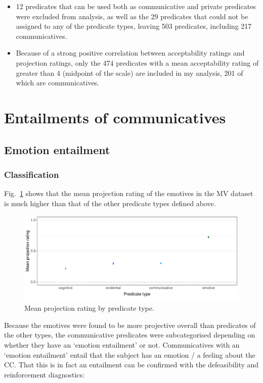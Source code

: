 \documentclass[11pt,fleqn]{article}
\newcommand{\figref}[1]{Fig.~\ref{#1}}
\newcommand{\6}{\mbox{$[\hspace*{-.6mm}[$}}
\newcommand{\9}{\mbox{$]\hspace*{-.6mm}]$}}
\begin{document}
\begin{itemize}
\begin{itemize}
	\end{itemize}
	\item 12 predicates that can be used both as communicative and private predicates were excluded from analysis, as well as the 29 predicates that could not be assigned to any of the predicate types, leaving 503 predicates, including 217 communicatives.
	\item Because of a strong positive correlation between acceptability ratings and projection ratings, only the 474 predicates with a mean acceptability rating of greater than 4 (midpoint of the scale) are included in my analysis, 201 of which are communicatives.
\end{itemize}

\section{Entailments of communicatives}
\subsection{Emotion entailment}
\subsubsection{Classification}
\figref{projpredtype} shows that the mean projection rating of the emotives in the MV dataset is much higher than that of the other predicate types defined above.

\begin{figure}[H]
	\centering
	\includegraphics[width=1\textwidth]{projection-by-predicateType}
	\caption{Mean projection rating by predicate type.}
	\label{projpredtype}
\end{figure}

Because the emotives were found to be more projective overall than predicates of the other types, the communicative predicates were subcategorised depending on whether they have an ‘emotion entailment’ or not. Communicatives with an `emotion entailment' entail that the subject has an emotion / a feeling about the CC. That this is in fact an entailment can be confirmed with the defeasibility and reinforcement diagnostics:
\end{document}
